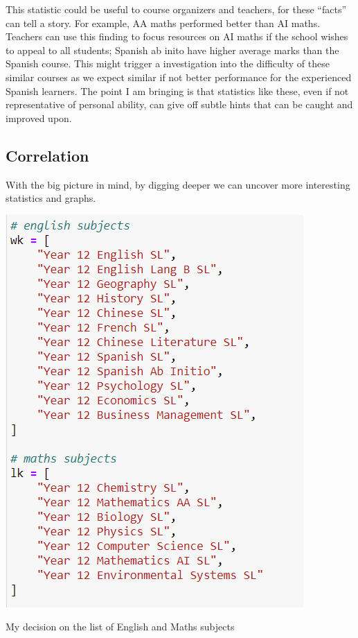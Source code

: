 \documentclass[a4paper,12pt]{tufte-handout}
\begin{document}
This statistic could be useful to course organizers and teachers, for these ``facts'' can tell a story. For example, AA maths performed better than AI maths. Teachers can use this finding to focus resources on AI maths if the school wishes to appeal to all students; Spanish ab inito have higher average marks than the Spanish course. This might trigger a investigation into the difficulty of these similar courses as we expect similar if not better performance for the experienced Spanish learners. The point I am bringing is that statistics like these, even if not representative of personal ability, can give off subtle hints that can be caught and improved upon.

\subsection{Correlation}

With the big picture in mind, by digging deeper we can uncover more interesting statistics and graphs.

\begin{marginfigure}
    \includegraphics[scale=0.5]{assets/wklk.png}
    \caption{My decision on the list of English and Maths subjects}
\end{marginfigure}
\end{document}
